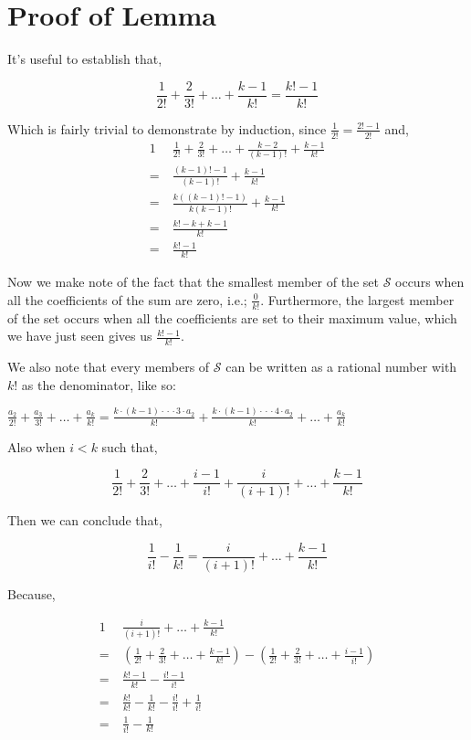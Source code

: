 \documentclass{article}
\begin{document}
\break
\section*{Proof of Lemma}

It's useful to establish that,

\[\frac{1}{2!} + \frac{2}{3!} + \dots{} + \frac{k-1}{k!} = \frac{k!-1}{k!}\]

Which is fairly trivial to demonstrate by induction, since $\frac{1}{2!} = \frac{2!-1}{2!}$ and, 
\begin{alignat*}{1}
  &\frac{1}{2!} + \frac{2}{3!} + \dots{} + \frac{k-2}{(k-1)!} + \frac{k-1}{k!}\\
  =\  &\frac{(k-1)!-1}{(k-1)!} + \frac{k-1}{k!}\\
  =\  &\frac{k((k-1)!-1)}{k(k-1)!} + \frac{k-1}{k!}\\
  =\  &\frac{k!-k+k-1}{k!}\\
  =\  &\frac{k!-1}{k!}
\end{alignat*}

Now we make note of the fact that the smallest member of the set $\mathcal{S}$ 
occurs when all the coefficients of the sum are zero, i.e.; $\frac{0}{k!}$.
Furthermore, the largest member of the set occurs when all the coefficients are set to
their maximum value, which we have just seen gives us $\frac{k!-1}{k!}$.

We also note that every members of $\mathcal{S}$ can be written as a rational number
with $k!$ as the denominator, like so:\newline

\centerline{$\frac{a_2}{2!} + \frac{a_3}{3!} + \dots{} + \frac{a_k}{k!}
= \frac{k\cdot{}(k-1)\cdot{}\cdot{}\cdot{}3\cdot{}a_2}{k!}
+ \frac{k\cdot{}(k-1)\cdot{}\cdot{}\cdot{}4\cdot{}a_2}{k!}
+ \dots{}
+ \frac{a_k}{k!}$}

Also when $i<k$ such that,

\[\frac{1}{2!} + \frac{2}{3!}
+ \dots{}
+ \frac{i-1}{i!}
+ \frac{i}{(i+1)!}
+ \dots{}
+ \frac{k-1}{k!}
\]

Then we can conclude that,

\[\frac{1}{i!} - \frac{1}{k!}
= \frac{i}{(i+1)!}
+ \dots{}
+ \frac{k-1}{k!}
\]

Because,

\begin{alignat*}{1}
  &\frac{i}{(i+1)!} + \dots{} + \frac{k-1}{k!}\\
  =\  &(\frac{1}{2!} + \frac{2}{3!} + \dots{} + \frac{k-1}{k!})
  - (\frac{1}{2!} + \frac{2}{3!} + \dots{} + \frac{i-1}{i!})\\
  =\  &\frac{k!-1}{k!} - \frac{i!-1}{i!}\\
  =\  &\frac{k!}{k!} - \frac{1}{k!} - \frac{i!}{i!} + \frac{1}{i!}\\
  =\  &\frac{1}{i!} - \frac{1}{k!}
\end{alignat*}
\end{document}

